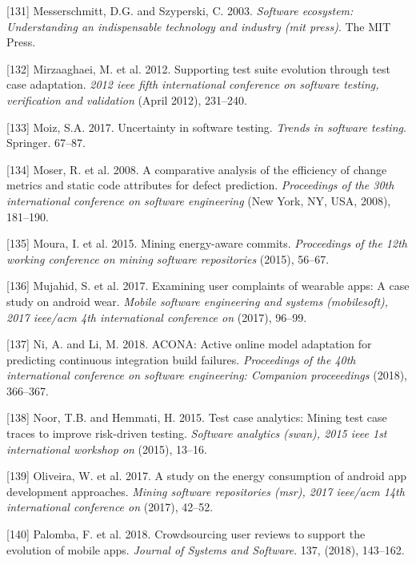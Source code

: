 \documentclass[]{book}
\begin{document}
\hypertarget{ref-Messerschmitt2003}{}
{[}131{]} Messerschmitt, D.G. and Szyperski, C. 2003. \emph{Software
ecosystem: Understanding an indispensable technology and industry (mit
press)}. The MIT Press.

\hypertarget{ref-supportingtestsuite}{}
{[}132{]} Mirzaaghaei, M. et al. 2012. Supporting test suite evolution
through test case adaptation. \emph{2012 ieee fifth international
conference on software testing, verification and validation} (April
2012), 231--240.

\hypertarget{ref-moiz2017uncertainty}{}
{[}133{]} Moiz, S.A. 2017. Uncertainty in software testing. \emph{Trends
in software testing}. Springer. 67--87.

\hypertarget{ref-Moser2008}{}
{[}134{]} Moser, R. et al. 2008. A comparative analysis of the
efficiency of change metrics and static code attributes for defect
prediction. \emph{Proceedings of the 30th international conference on
software engineering} (New York, NY, USA, 2008), 181--190.

\hypertarget{ref-MPEC2015}{}
{[}135{]} Moura, I. et al. 2015. Mining energy-aware commits.
\emph{Proceedings of the 12th working conference on mining software
repositories} (2015), 56--67.

\hypertarget{ref-mujahid2017examining}{}
{[}136{]} Mujahid, S. et al. 2017. Examining user complaints of wearable
apps: A case study on android wear. \emph{Mobile software engineering
and systems (mobilesoft), 2017 ieee/acm 4th international conference on}
(2017), 96--99.

\hypertarget{ref-ni2018acona}{}
{[}137{]} Ni, A. and Li, M. 2018. ACONA: Active online model adaptation
for predicting continuous integration build failures. \emph{Proceedings
of the 40th international conference on software engineering: Companion
proceeedings} (2018), 366--367.

\hypertarget{ref-noor2015test}{}
{[}138{]} Noor, T.B. and Hemmati, H. 2015. Test case analytics: Mining
test case traces to improve risk-driven testing. \emph{Software
analytics (swan), 2015 ieee 1st international workshop on} (2015),
13--16.

\hypertarget{ref-OOC2017}{}
{[}139{]} Oliveira, W. et al. 2017. A study on the energy consumption of
android app development approaches. \emph{Mining software repositories
(msr), 2017 ieee/acm 14th international conference on} (2017), 42--52.

\hypertarget{ref-palomba2018crowdsourcing}{}
{[}140{]} Palomba, F. et al. 2018. Crowdsourcing user reviews to support
the evolution of mobile apps. \emph{Journal of Systems and Software}.
137, (2018), 143--162.
\end{document}
